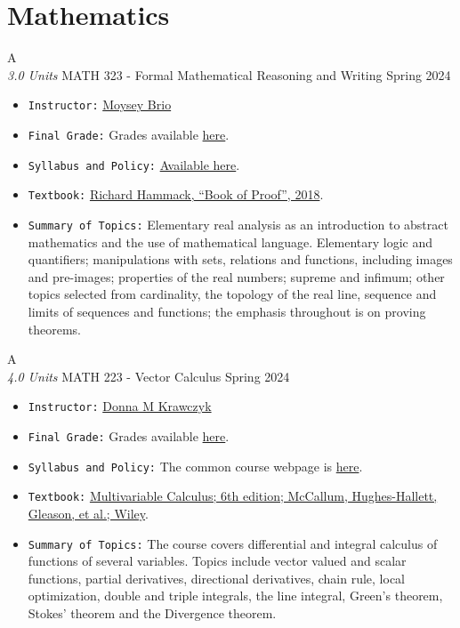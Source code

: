 \section{Mathematics}

\cventry
{A \\ \small{\textit{3.0 Units}}}
{MATH 323 - Formal Mathematical Reasoning and Writing}
{Spring 2024}
{}
{}
{
  \begin{itemize}
    \item \texttt{Instructor:} \href{https://math.arizona.edu/~brio/}{Moysey Brio}
    \item \texttt{Final Grade:} Grades available \href{https://mhrezaei.com/assets/cv/courses/Spring2024/MATH323/Grades.pdf}{here}.
    \item \texttt{Syllabus and Policy:} \href{https://mhrezaei.com/assets/cv/courses/Spring2024/MATH323/Syllabus.pdf}{Available here}.
    \item \texttt{Textbook:} \href{}{Richard Hammack, “Book of Proof”, 2018}.
    \item \texttt{Summary of Topics:} Elementary real analysis as an introduction to abstract mathematics and the use
    of mathematical language. Elementary logic and quantifiers; manipulations with sets, relations and
    functions, including images and pre-images; properties of the real numbers; supreme and infimum;
    other topics selected from cardinality, the topology of the real line, sequence and limits of sequences
    and functions; the emphasis throughout is on proving theorems.
  \end{itemize}
}

\cventry
{A \\ \small{\textit{4.0 Units}}}
{MATH 223 - Vector Calculus}
{Spring 2024}
{}
{}
{
  \begin{itemize}
    \item \texttt{Instructor:} \href{https://math.arizona.edu/~krawczyk/}{Donna M Krawczyk}
    \item \texttt{Final Grade:} Grades available \href{https://mhrezaei.com/assets/cv/courses/Spring2024/MATH323/Grades.pdf}{here}.
    \item \texttt{Syllabus and Policy:} The common course webpage is \href{https://calculus.math.arizona.edu/math223}{here}.
    \item \texttt{Textbook:} \href{}{Multivariable Calculus; 6th edition; McCallum, Hughes-Hallett, Gleason, et al.; Wiley}.
    \item \texttt{Summary of Topics:} The course covers differential and integral calculus of functions of several variables. Topics include vector valued and scalar functions, partial derivatives, directional derivatives, chain rule, local optimization, double and triple integrals, the line integral, Green's theorem, Stokes' theorem and the Divergence theorem. 
  \end{itemize}
}

